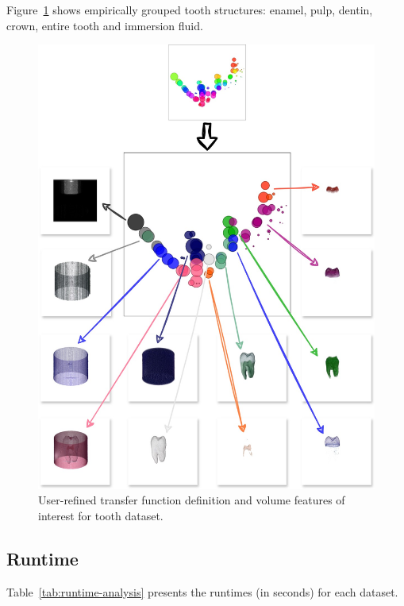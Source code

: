Figure~\ref{fig:tooth-groups} shows empirically grouped tooth structures: enamel, pulp, dentin, crown, entire tooth and immersion fluid.

\begin{figure}[htb!]
    \centering
    \includegraphics[width=\columnwidth]{figs/tooth-groups.jpg}
    \caption{User-refined transfer function definition and volume features of interest for tooth dataset.}
    \label{fig:tooth-groups}
\end{figure}


\subsection{Runtime}
\label{subsect:runtime-analysis}

Table~\ref{tab:runtime-analysis} presents the runtimes (in seconds) for each dataset.

